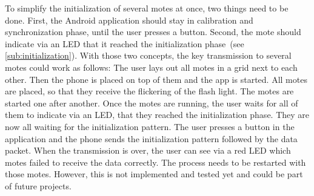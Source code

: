 \documentclass{sig-alternate} %
\begin{document}
To simplify the initialization of several motes at once, two things need to be done.
First, the Android application should stay in calibration and synchronization phase, until the user presses a button.
Second, the mote should indicate via an LED that it reached the initialization phase~(see \ref{sub:initialization}).
With those two concepts, the key transmission to several motes could work as follows:
The user lays out all motes in a grid next to each other.
Then the phone is placed on top of them and the app is started.
All motes are placed, so that they receive the flickering of the flash light.
The motes are started one after another.
Once the motes are running, the user waits for all of them to indicate via an LED, that they reached the initialization phase.
They are now all waiting for the initialization pattern.
The user presses a button in the application and the phone sends the initialization pattern followed by the data packet.
When the transmission is over, the user can see via a red LED which motes failed to receive the data correctly.
The process needs to be restarted with those motes.
However, this is not implemented and tested yet and could be part of future projects.

% 


\end{document}

